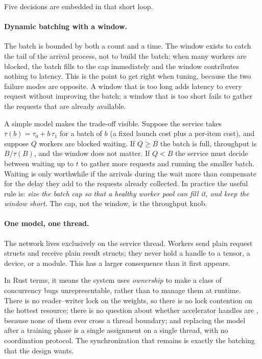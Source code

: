 Five decisions are embedded in that short loop.

\paragraph{Dynamic batching with a window.} The batch is bounded by both a count
and a time. The window exists to catch the tail of the arrival process, not to
build the batch: when many workers are blocked, the batch fills to the cap
immediately and the window contributes nothing to latency. This is the point to
get right when tuning, because the two failure modes are opposite. A window that
is too long adds latency to every request without improving the batch; a window
that is too short fails to gather the requests that are already available.

A simple model makes the trade-off visible. Suppose the service takes
$\tau(b) = \tau_0 + b\,\tau_1$ for a batch of $b$ (a fixed launch cost plus a
per-item cost), and suppose $Q$ workers are blocked waiting. If $Q \ge B$ the
batch is full, throughput is $B/\tau(B)$, and the window does not matter. If
$Q < B$ the service must decide between waiting up to $t$ to gather more requests
and running the smaller batch. Waiting is only worthwhile if the arrivals during
the wait more than compensate for the delay they add to the requests already
collected. In practice the useful rule is: \emph{size the batch cap so that a
healthy worker pool can fill it, and keep the window short}. The cap, not the
window, is the throughput knob.

\paragraph{One model, one thread.} The network lives exclusively on the service
thread. Workers send plain request structs and receive plain result structs; they
never hold a handle to a tensor, a device, or a module. This has a larger
consequence than it first appears.

In Rust terms, it means the system uses \emph{ownership} to make a class of
concurrency bugs unrepresentable, rather than  to manage
them at runtime. There is no reader--writer lock on the weights, so there is no
lock contention on the hottest resource; there is no question about whether
accelerator handles are , because none of them ever cross a thread
boundary; and replacing the model after a training phase is a single assignment
on a single thread, with no coordination protocol. The synchronization that
remains is exactly the batching that the design wants.

